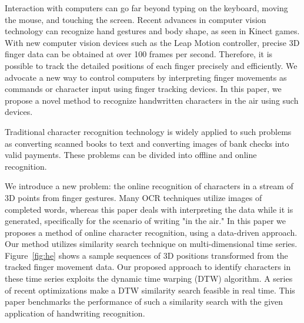 Interaction with computers can go far beyond typing on the keyboard,
moving the mouse, and touching the screen. 
Recent advances in computer vision technology can recognize 
hand gestures and body shape, as seen in Kinect games. 
With new computer vision devices such as the Leap Motion controller, 
 precise 3D finger data can be obtained at over 100 frames per second.   
Therefore, it is possible to track the detailed positions of 
each finger precisely and efficiently. 
We advocate a new way to control computers by interpreting finger
movements as commands or character input using finger tracking devices.
In this paper, we propose a novel method to recognize handwritten
 characters in the air using such devices. 


Traditional character recognition technology is widely applied to such problems
as converting scanned books to text and converting images of bank checks into
valid payments. These problems can be divided into offline and online
recognition. 

We introduce a new problem: the online recognition of characters in a
 stream of 3D points from finger gestures. 
 Many OCR techniques utilize images of completed words, 
 whereas this paper deals with interpreting the data while it is generated,
specifically for the scenario of writing "in the air."  
In this paper we proposes a method of online character recognition, 
using a data-driven approach. 
Our method utilizes similarity search
technique on multi-dimensional time series. Figure~\ref{fig:he} shows a sample
sequences of 3D positions transformed from the tracked finger movement data. Our proposed approach to identify characters in these time series
 exploits the dynamic time warping (DTW) algorithm. 
A series of recent optimizations make a
DTW similarity search feasible in real time. This paper benchmarks the
performance of such a similarity search with the given application of
handwriting recognition.




